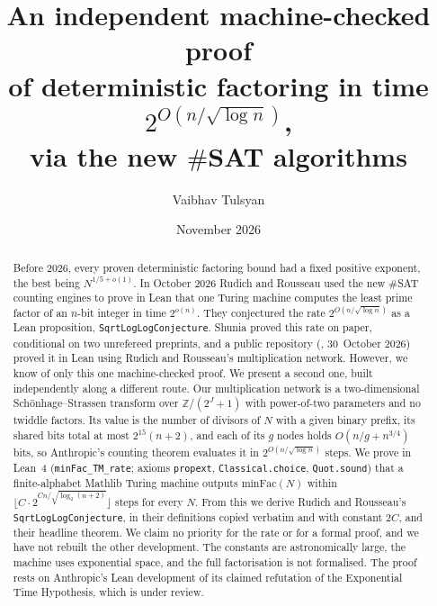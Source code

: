 \documentclass[10pt]{amsart}
\theoremstyle{plain}
\theoremstyle{definition}
\theoremstyle{remark}
\numberwithin{equation}{section}
\begin{document}
\title[A second machine-checked proof of factoring in $2^{O(n/\sqrt{\log n})}$]{An independent machine-checked proof\\ of deterministic factoring in time $2^{O(n/\sqrt{\log n})}$,\\ via the new $\#$SAT algorithms}

\author{Vaibhav Tulsyan}

\date{November 2026}


\begin{abstract}
Before 2026, every proven deterministic factoring bound had a fixed positive exponent, the best being
$N^{1/5+o(1)}$. In October 2026 Rudich and Rousseau used the new $\#$SAT counting engines to prove in
Lean that one Turing machine computes the least prime factor of an $n$-bit integer in time $2^{o(n)}$.
They conjectured the rate $2^{O(n/\sqrt{\log n})}$ as a Lean proposition,
\texttt{SqrtLogLogConjecture}. Shunia proved this rate on paper, conditional on two unrefereed
preprints, and a public repository (, 30~October 2026) proved
it in Lean using Rudich and Rousseau's multiplication network. However, we know of only this one
machine-checked proof. We present a second one, built independently along a different route. Our
multiplication network is a two-dimensional Sch\"onhage--Strassen transform over $\mathbb{Z}/(2^J+1)$
with power-of-two parameters and no twiddle factors. Its value is the number of divisors of $N$ with a
given binary prefix, its shared bits total at most $2^{15}(n+2)$, and each of its $g$ nodes holds
$O(n/g+n^{3/4})$ bits, so Anthropic's counting theorem evaluates it in $2^{O(n/\sqrt{\log n})}$ steps.
We prove in Lean~4 (\texttt{minFac\_TM\_rate}; axioms \texttt{propext}, \texttt{Classical.choice},
\texttt{Quot.sound}) that a finite-alphabet Mathlib Turing machine outputs $\mathrm{minFac}(N)$ within
$\lfloor C\cdot2^{Cn/\sqrt{\log_2(n+2)}}\rfloor$ steps for every $N$. From this we derive Rudich and
Rousseau's \texttt{SqrtLogLogConjecture}, in their definitions copied verbatim and with constant $2C$,
and their headline theorem. We claim no priority for the rate or for a formal proof, and we have not
rebuilt the other development. The constants are astronomically large, the machine uses exponential
space, and the full factorisation is not formalised. The proof rests on Anthropic's Lean development
of its claimed refutation of the Exponential Time Hypothesis, which is under review.
\end{abstract}
\end{document}
